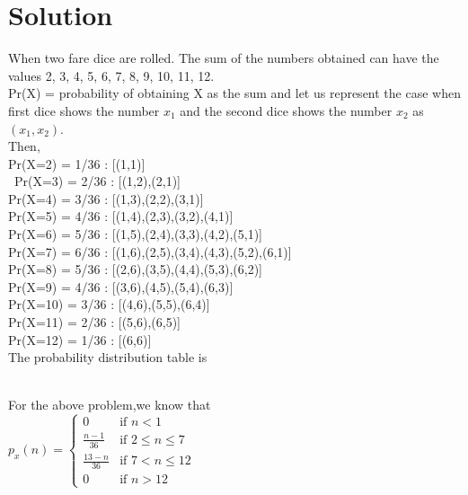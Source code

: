 \documentclass[journal,12pt,twocolumn]{IEEEtran}
\begin{document}
\section{Solution}
 When two fare dice are rolled. The sum of the numbers obtained can have the values 2, 3, 4, 5, 6, 7, 8, 9, 10, 11, 12.\\
Pr(X) = probability of obtaining X as the sum and let us represent the case when first dice shows the number $x_1$ and the second dice shows the number $x_2$ as $(x_1,x_2)$.\\
\vspace{2mm}
Then,\\
Pr(X=2) = 1/36 : [(1,1)]\\\
Pr(X=3) = 2/36 : [(1,2),(2,1)]\\
Pr(X=4) = 3/36 : [(1,3),(2,2),(3,1)]\\
Pr(X=5) = 4/36 : [(1,4),(2,3),(3,2),(4,1)]\\
Pr(X=6) = 5/36 : [(1,5),(2,4),(3,3),(4,2),(5,1)]\\
Pr(X=7) = 6/36 : [(1,6),(2,5),(3,4),(4,3),(5,2),(6,1)]\\
Pr(X=8) = 5/36 : [(2,6),(3,5),(4,4),(5,3),(6,2)]\\
Pr(X=9) = 4/36 : [(3,6),(4,5),(5,4),(6,3)]\\
Pr(X=10) = 3/36 : [(4,6),(5,5),(6,4)]\\
Pr(X=11) = 2/36 : [(5,6),(6,5)]\\
Pr(X=12) = 1/36 : [(6,6)]\\
\vspace{5mm}
The probability distribution table is 
\renewcommand{\arraystretch}{2}
\begin{table}[hbt!]
\end{table}\\
For the above problem,we know that\\
$p_x(n) = 
\left\{
	\begin{array}{ll}
		0  & \mbox{if } n < 1 \\
		\displaystyle\frac{n-1}{36} & \mbox{if } 2\leq n \leq 7\\
		\displaystyle\frac{13-n}{36} & \mbox{if } 7<n \leq 12\\
		0 & \mbox{if } n > 12
	\end{array}
\right.$
\end{document}
